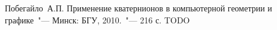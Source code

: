 \renewcommand{\bibname}{Список использованных источников}
\begin{thebibliography}{99}
 Побегайло~А.П. Применение кватернионов в компьютерной геометрии и графике~"--- Минск: БГУ,
2010.~"--- 216 с.
 TODO
\end{thebibliography}
